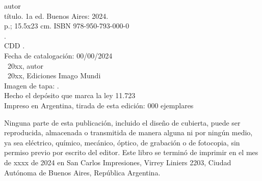 \noindent autor \\
\noindent título. 1a ed. Buenos Aires: 2024.\\
 p.; 15.5x23 cm. ISBN 978-950-793-000-0 \\
. \\
\noindent CDD .\\
\noindent Fecha de catalogación: 00/00/2024 \\
\noindent \textcopyright~20xx, autor \\
\noindent \textcopyright~20xx, Ediciones Imago Mundi\\
\noindent Imagen de tapa: .\\
\noindent Hecho el depósito que marca la ley 11.723\\
\noindent Impreso en Argentina, tirada de esta edición: 000 ejemplares\\

\vfill

\noindent Ninguna parte de esta publicación, incluido el diseño de cubierta, puede ser reproducida, almacenada o transmitida de manera alguna ni por ningún medio, ya sea eléctrico, químico, mecánico, óptico, de grabación o de fotocopia, sin permiso previo por escrito del editor. Este libro se terminó de imprimir en el mes de xxxx de 2024 en San Carlos Impresiones, Virrey Liniers 2203, Ciudad Autónoma de Buenos Aires, República Argentina.
